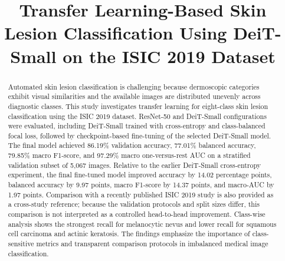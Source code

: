 \documentclass[conference]{IEEEtran}
\begin{document}
\title{Transfer Learning-Based Skin Lesion Classification Using DeiT-Small on the ISIC 2019 Dataset}


\author{
\begin{minipage}[t]{0.32\textwidth}
\centering
{}
\end{minipage}
\hfill
\begin{minipage}[t]{0.32\textwidth}
\centering
{}
\end{minipage}
\hfill
\begin{minipage}[t]{0.32\textwidth}
\centering
{}
\end{minipage}
}

\maketitle

\begin{abstract}
Automated skin lesion classification is challenging because dermoscopic categories exhibit visual similarities and the available images are distributed unevenly across diagnostic classes. This study investigates transfer learning for eight-class skin lesion classification using the ISIC 2019 dataset. ResNet-50 and DeiT-Small configurations were evaluated, including DeiT-Small trained with cross-entropy and class-balanced focal loss, followed by checkpoint-based fine-tuning of the selected DeiT-Small model. The final model achieved 86.19\% validation accuracy, 77.01\% balanced accuracy, 79.85\% macro F1-score, and 97.29\% macro one-versus-rest AUC on a stratified validation subset of 5,067 images. Relative to the earlier DeiT-Small cross-entropy experiment, the final fine-tuned model improved accuracy by 14.02 percentage points, balanced accuracy by 9.97 points, macro F1-score by 14.37 points, and macro-AUC by 1.97 points. Comparison with a recently published ISIC 2019 study is also provided as a cross-study reference; because the validation protocols and split sizes differ, this comparison is not interpreted as a controlled head-to-head improvement. Class-wise analysis shows the strongest recall for melanocytic nevus and lower recall for squamous cell carcinoma and actinic keratosis. The findings emphasize the importance of class-sensitive metrics and transparent comparison protocols in imbalanced medical image classification.
\end{abstract}
\end{document}
